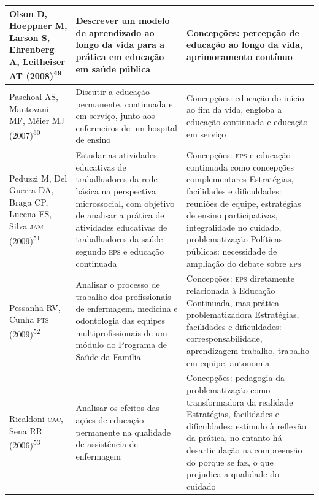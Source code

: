 \documentclass{article}
\begin{document}
\begin{table}
\begin{xtabular}{ l | l | l }
Olson D, Hoeppner M, Larson S, Ehrenberg A, Leitheiser AT (2008)\textsuperscript{49}

& Descrever um modelo de aprendizado ao longo da vida para a prática em educação
em saúde pública
& Concepções: percepção de educação ao longo da vida, aprimoramento contínuo
\\ \hline

Paschoal AS, Mantovani MF, Méier MJ (2007)\textsuperscript{50}

& Discutir a educação permanente, continuada e em serviço, junto aos enfermeiros
de um hospital de ensino
& Concepções: educação do início ao fim da vida, engloba a educação continuada e
educação em serviço
\\ \hline

Peduzzi M, Del Guerra DA, Braga CP, Lucena FS, Silva \textsc{jam} (2009)\textsuperscript{51}

& Estudar as atividades educativas de trabalhadores da rede básica na
perspectiva microssocial, com objetivo de analisar a prática de atividades
educativas de trabalhadores da saúde segundo \textsc{eps} e educação continuada
& Concepções: \textsc{eps} e educação continuada como concepções complementares
Estratégias, facilidades e dificuldades: reuniões de equipe, estratégias de
ensino participativas, integralidade no cuidado, problematização Políticas
públicas: necessidade de ampliação do debate sobre \textsc{eps}
\\ \hline

Pessanha RV, Cunha \textsc{fts} (2009)\textsuperscript{52}

& Analisar o processo de trabalho dos profissionais de enfermagem, medicina e
odontologia das equipes multiprofissionais de um módulo do Programa de Saúde da
Família
& Concepções: \textsc{eps} diretamente relacionada à Educação Continuada, mas prática
problematizadora Estratégias, facilidades e dificuldades: corresponsabilidade,
aprendizagem-trabalho, trabalho em equipe, autonomia
\\ \hline

Ricaldoni \textsc{cac}, Sena RR (2006)\textsuperscript{53}

& Analisar os efeitos das ações de educação permanente na qualidade de
assistência de enfermagem
& Concepções: pedagogia da problematização como transformadora da realidade
Estratégias, facilidades e dificuldades: estímulo à reflexão da prática, no
entanto há desarticulação na compreensão do porque se faz, o que prejudica a
qualidade do cuidado
\\ \hline


\end{xtabular}
\end{table}
\end{document}
